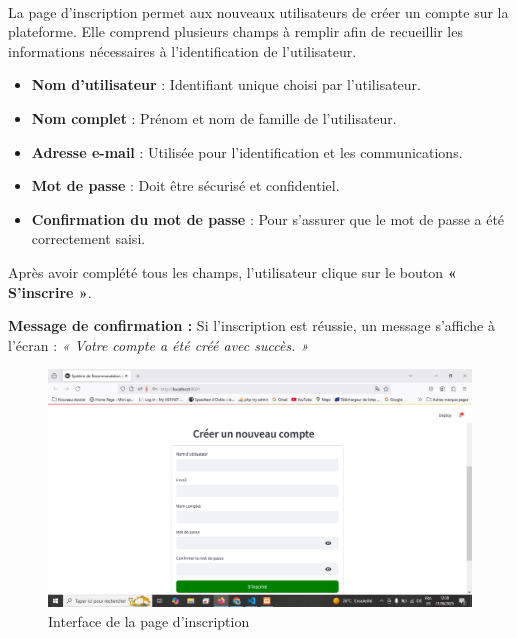 \paragraph{}
La page d'inscription permet aux nouveaux utilisateurs de créer un compte sur la plateforme. Elle comprend plusieurs champs à remplir afin de recueillir les informations nécessaires à l’identification de l’utilisateur.
\hfill \break
\begin{itemize}
  \item \textbf{Nom d'utilisateur} : Identifiant unique choisi par l'utilisateur.
  \hfill \break
  \item \textbf{Nom complet} : Prénom et nom de famille de l'utilisateur.
  \hfill \break
  \item \textbf{Adresse e-mail} : Utilisée pour l'identification et les communications.
  \hfill \break
  \item \textbf{Mot de passe} : Doit être sécurisé et confidentiel.
  \hfill \break
  \item \textbf{Confirmation du mot de passe} : Pour s'assurer que le mot de passe a été correctement saisi.
\end{itemize}
\hfill \break
Après avoir complété tous les champs, l'utilisateur clique sur le bouton \textbf{« S'inscrire »}.

\medskip

\noindent
\textbf{Message de confirmation :} Si l'inscription est réussie, un message s'affiche à l'écran : \textit{« Votre compte a été créé avec succès. »}

\vspace{0.5cm}
\hfill \break
\begin{figure}[h]
    \centering
    \includegraphics[width=\linewidth]{images/inscription.png}
    \caption{Interface de la page d'inscription}
\end{figure}

